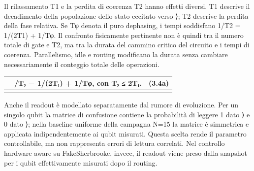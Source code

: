 Il rilassamento T1 e la perdita di coerenza T2 hanno effetti diversi. T1 descrive il decadimento della popolazione dello stato eccitato verso ⟩; T2 descrive la perdita della fase relativa. Se Tφ denota il puro dephasing, i tempi soddisfano 1/T2 = 1/(2T1) + 1/Tφ. Il confronto fisicamente pertinente non è quindi tra il numero totale di gate e T2, ma tra la durata del cammino critico del circuito e i tempi di coerenza. Parallelismo, idle e routing modificano la durata senza cambiare necessariamente il conteggio totale delle operazioni.

{\def\LTcaptype{none} %
\begin{longtable}[]{@{}
  >{\raggedright\arraybackslash}p{}
  >{\raggedright\arraybackslash}p{}
  >{\raggedright\arraybackslash}p{}@{}}
\toprule\noalign{}
\begin{minipage}[b]{\linewidth}\raggedright
\end{minipage} & \begin{minipage}[b]{\linewidth}\centering
1/T₂ = 1/(2T₁) + 1/Tφ, con T₂ ≤ 2T₁.
\end{minipage} & \begin{minipage}[b]{\linewidth}\raggedleft
(3.4a)
\end{minipage} \\
\midrule\noalign{}
\endhead
\bottomrule\noalign{}
\endlastfoot
\end{longtable}
}

Anche il readout è modellato separatamente dal rumore di evoluzione. Per un singolo qubit la matrice di confusione contiene la probabilità di leggere 1 dato ⟩ e 0 dato ⟩; nella baseline uniforme della campagna N=15 la matrice è simmetrica e applicata indipendentemente ai qubit misurati. Questa scelta rende il parametro controllabile, ma non rappresenta errori di lettura correlati. Nel controllo hardware-aware su FakeSherbrooke, invece, il readout viene preso dalla snapshot per i qubit effettivamente misurati dopo il routing.

